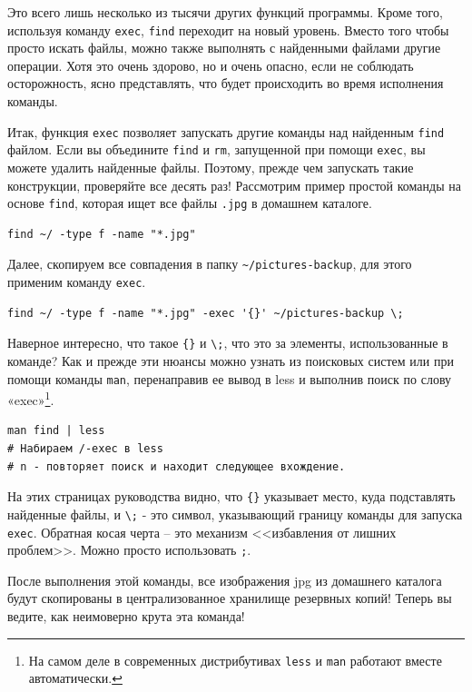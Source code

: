\documentclass[a4paper,12pt,final,openany]{extbook}
\begin{document}
Это всего лишь несколько из тысячи других функций программы. Кроме того,
используя команду \texttt{exec}, \texttt{find} переходит на новый
уровень. Вместо того чтобы просто искать файлы, можно также выполнять с
найденными файлами другие операции. Хотя это очень здорово, но и очень опасно, если не
соблюдать осторожность, ясно представлять, что будет происходить во
время исполнения команды.

Итак, функция \texttt{exec} позволяет запускать другие
команды над найденным \texttt{find} файлом. Если вы объедините
\texttt{find} и \texttt{rm}, запущенной при помощи \texttt{exec}, вы
можете удалить найденные файлы. Поэтому, прежде чем запускать такие
конструкции, проверяйте все десять раз!
Рассмотрим пример простой команды на основе \texttt{find}, которая ищет все файлы \texttt{.jpg} в
домашнем каталоге.

\begin{verbatim}
find ~/ -type f -name "*.jpg"
\end{verbatim}
Далее, скопируем все совпадения в папку
\texttt{\textasciitilde{}/pictures-backup}, для этого применим команду \texttt{exec}.

\begin{verbatim}
find ~/ -type f -name "*.jpg" -exec '{}' ~/pictures-backup \;
\end{verbatim}

Наверное интересно, что такое
\texttt{\textquotesingle{}\{\}\textquotesingle{}} и
\texttt{\textbackslash{};}, что это за элементы, использованные в
команде? Как и прежде эти нюансы можно узнать из поисковых систем или
при помощи команды \texttt{man}, перенаправив ее вывод в less и
выполнив поиск по слову «exec»\footnote{На самом деле в современных дистрибутивах \texttt{less} и \texttt{man} работают вместе автоматически.}.

\begin{verbatim}
man find | less
# Набираем /-exec в less
# n - повторяет поиск и находит следующее вхождение.
\end{verbatim}

На этих страницах руководства видно, что
\texttt{\textquotesingle{}\{\}\textquotesingle{}} указывает место, куда
подставлять найденные файлы, и \texttt{\textbackslash{};} - это символ,
указывающий границу команды для запуска \texttt{exec}. Обратная косая
черта -- это механизм <<избавления от лишних проблем>>. Можно просто
использовать \texttt{\textquotesingle{};\textquotesingle{}}.

После выполнения этой команды, все изображения jpg из домашнего каталога
будут скопированы в централизованное хранилище резервных копий! Теперь
вы ведите, как неимоверно крута эта команда!
\end{document}
